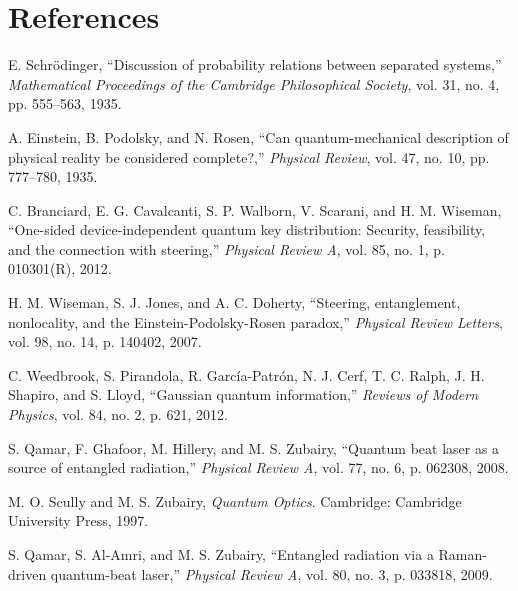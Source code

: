 
\chapter*{References}

\begin{thebibliography}{99}

E. Schrödinger, ``Discussion of probability relations between separated systems,'' \textit{Mathematical Proceedings of the Cambridge Philosophical Society}, vol. 31, no. 4, pp. 555--563, 1935.

A. Einstein, B. Podolsky, and N. Rosen, ``Can quantum-mechanical description of physical reality be considered complete?,'' \textit{Physical Review}, vol. 47, no. 10, pp. 777--780, 1935.

C. Branciard, E. G. Cavalcanti, S. P. Walborn, V. Scarani, and H. M. Wiseman, ``One-sided device-independent quantum key distribution: Security, feasibility, and the connection with steering,'' \textit{Physical Review A}, vol. 85, no. 1, p. 010301(R), 2012.

H. M. Wiseman, S. J. Jones, and A. C. Doherty, ``Steering, entanglement, nonlocality, and the Einstein-Podolsky-Rosen paradox,'' \textit{Physical Review Letters}, vol. 98, no. 14, p. 140402, 2007.

C. Weedbrook, S. Pirandola, R. García-Patrón, N. J. Cerf, T. C. Ralph, J. H. Shapiro, and S. Lloyd, ``Gaussian quantum information,'' \textit{Reviews of Modern Physics}, vol. 84, no. 2, p. 621, 2012.

S. Qamar, F. Ghafoor, M. Hillery, and M. S. Zubairy, ``Quantum beat laser as a source of entangled radiation,'' \textit{Physical Review A}, vol. 77, no. 6, p. 062308, 2008.

M. O. Scully and M. S. Zubairy, \textit{Quantum Optics}. Cambridge: Cambridge University Press, 1997.

S. Qamar, S. Al-Amri, and M. S. Zubairy, ``Entangled radiation via a Raman-driven quantum-beat laser,'' \textit{Physical Review A}, vol. 80, no. 3, p. 033818, 2009.


\end{thebibliography}
